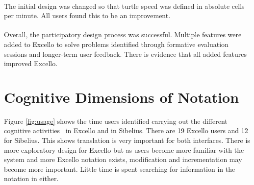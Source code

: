 \paragraph{} The initial design was changed so that turtle speed was defined in absolute cells per minute. All users found this to be an improvement.

\paragraph{} Overall, the participatory design process was successful. Multiple features were added to Excello to solve problems identified through formative evaluation sessions and longer-term user feedback. There is evidence that all added features improved Excello.

\section{Cognitive Dimensions of Notation}

\paragraph{} Figure \ref{fig:usage} shows the time users identified carrying out the different cognitive activities~\cite{blackwell:tutorial} in Excello and in Sibelius. There are 19 Excello users and 12 for Sibelius. This shows translation is very important for both interfaces. There is more exploratory design for Excello but as users become more familiar with the system and more Excello notation exists, modification and incrementation may become more important. Little time is spent searching for information in the notation in either.

